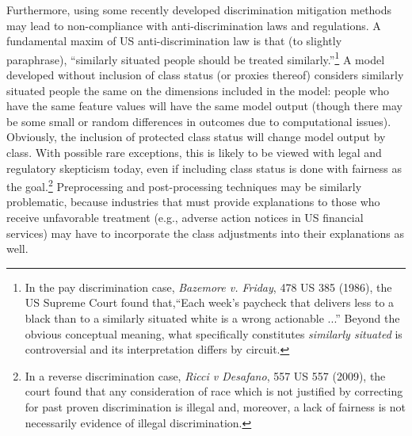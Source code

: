 \documentclass[information,article,submit,moreauthors,pdftex]{definitions/mdpi}
\begin{document}
Furthermore, using some recently developed discrimination mitigation methods may lead to non-compliance with anti-discrimination laws and regulations.  A fundamental maxim of US anti-discrimination law is that (to slightly paraphrase), ``similarly situated people should be treated similarly.''\footnote{In the pay discrimination case, \textit{Bazemore v. Friday}, 478 US 385 (1986), the US Supreme Court found that,``Each week's paycheck that delivers less to a black than to a similarly situated white is a wrong actionable ...''  Beyond the obvious conceptual meaning, what specifically constitutes \textit{similarly situated} is controversial and its interpretation differs by circuit.} A model developed without inclusion of class status (or proxies thereof) considers similarly situated people the same on the dimensions included in the model: people who have the same feature values will have the same model output (though there may be some small or random differences in outcomes due to computational issues). Obviously, the inclusion of protected class status will change model output by class. With possible rare exceptions, this is likely to be viewed with legal and regulatory skepticism today, even if including class status is done with fairness as the goal.\footnote{In a reverse discrimination case, \textit{Ricci v Desafano}, 557 US 557 (2009), the court found that any consideration of race which is not justified by correcting for past proven discrimination is illegal and, moreover, a lack of fairness is not necessarily evidence of illegal discrimination.}  Preprocessing and post-processing techniques may be similarly problematic, because industries that must provide explanations to those who receive unfavorable treatment (e.g., adverse action notices in US financial services) may have to incorporate the class adjustments into their explanations as well.




\end{document}
